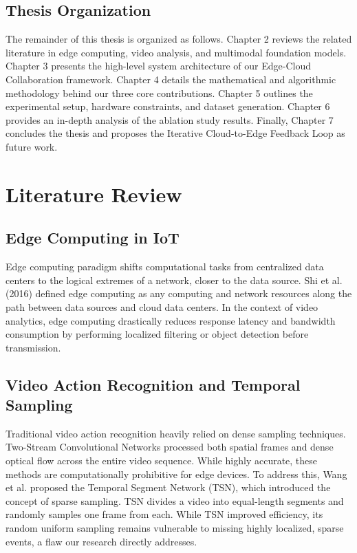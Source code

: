 \documentclass[12pt, a4paper]{report}
\begin{document}
\section{Thesis Organization}
The remainder of this thesis is organized as follows. Chapter 2 reviews the related literature in edge computing, video analysis, and multimodal foundation models. Chapter 3 presents the high-level system architecture of our Edge-Cloud Collaboration framework. Chapter 4 details the mathematical and algorithmic methodology behind our three core contributions. Chapter 5 outlines the experimental setup, hardware constraints, and dataset generation. Chapter 6 provides an in-depth analysis of the ablation study results. Finally, Chapter 7 concludes the thesis and proposes the Iterative Cloud-to-Edge Feedback Loop as future work.

\chapter{Literature Review}

\section{Edge Computing in IoT}
Edge computing paradigm shifts computational tasks from centralized data centers to the logical extremes of a network, closer to the data source. Shi et al. (2016) defined edge computing as any computing and network resources along the path between data sources and cloud data centers. In the context of video analytics, edge computing drastically reduces response latency and bandwidth consumption by performing localized filtering or object detection before transmission.

\section{Video Action Recognition and Temporal Sampling}
Traditional video action recognition heavily relied on dense sampling techniques. Two-Stream Convolutional Networks processed both spatial frames and dense optical flow across the entire video sequence. While highly accurate, these methods are computationally prohibitive for edge devices. To address this, Wang et al. proposed the Temporal Segment Network (TSN), which introduced the concept of sparse sampling. TSN divides a video into equal-length segments and randomly samples one frame from each. While TSN improved efficiency, its random uniform sampling remains vulnerable to missing highly localized, sparse events, a flaw our research directly addresses.
\end{document}
